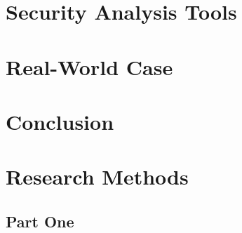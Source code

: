 \documentclass[a4paper,sigconf, language=french,
language=german, language=spanish, language=english]{acmart}
\begin{document}
\section{Security Analysis Tools}
\label{Tools}


\section{Real-World Case}
\label{RealCase}

\section{Conclusion}
\label{Conclusion}


\begin{acks}

\end{acks}




\appendix

\section{Research Methods}

\subsection{Part One}
\end{document}
